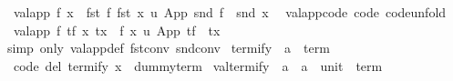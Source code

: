 \begin{isabellebody}
\ \ {\isachardoublequoteopen}valapp\ f\ x\ {\isacharequal}{\kern0pt}\ {\isacharparenleft}{\kern0pt}fst\ f\ {\isacharparenleft}{\kern0pt}fst\ x{\isacharparenright}{\kern0pt}{\isacharcomma}{\kern0pt}\ {\isasymlambda}u{\isachardot}{\kern0pt}\ App\ {\isacharparenleft}{\kern0pt}snd\ f\ {\isacharparenleft}{\kern0pt}{\isacharparenright}{\kern0pt}{\isacharparenright}{\kern0pt}\ {\isacharparenleft}{\kern0pt}snd\ x\ {\isacharparenleft}{\kern0pt}{\isacharparenright}{\kern0pt}{\isacharparenright}{\kern0pt}{\isacharparenright}{\kern0pt}{\isachardoublequoteclose}\isanewline
\isanewline
{}\isamarkupfalse%
\ valapp{\isacharunderscore}{\kern0pt}code\ {\isacharbrackleft}{\kern0pt}code{\isacharcomma}{\kern0pt}\ code{\isacharunderscore}{\kern0pt}unfold{\isacharbrackright}{\kern0pt}{\isacharcolon}{\kern0pt}\isanewline
\ \ {\isachardoublequoteopen}valapp\ {\isacharparenleft}{\kern0pt}f{\isacharcomma}{\kern0pt}\ tf{\isacharparenright}{\kern0pt}\ {\isacharparenleft}{\kern0pt}x{\isacharcomma}{\kern0pt}\ tx{\isacharparenright}{\kern0pt}\ {\isacharequal}{\kern0pt}\ {\isacharparenleft}{\kern0pt}f\ x{\isacharcomma}{\kern0pt}\ {\isasymlambda}u{\isachardot}{\kern0pt}\ App\ {\isacharparenleft}{\kern0pt}tf\ {\isacharparenleft}{\kern0pt}{\isacharparenright}{\kern0pt}{\isacharparenright}{\kern0pt}\ {\isacharparenleft}{\kern0pt}tx\ {\isacharparenleft}{\kern0pt}{\isacharparenright}{\kern0pt}{\isacharparenright}{\kern0pt}{\isacharparenright}{\kern0pt}{\isachardoublequoteclose}\isanewline
%
\isadelimproof
\ \ %
\endisadelimproof
%
\isatagproof
{}\isamarkupfalse%
\ {\isacharparenleft}{\kern0pt}simp\ only{\isacharcolon}{\kern0pt}\ valapp{\isacharunderscore}{\kern0pt}def\ fst{\isacharunderscore}{\kern0pt}conv\ snd{\isacharunderscore}{\kern0pt}conv{\isacharparenright}{\kern0pt}%
\endisatagproof
{\isafoldproof}%
%
\isadelimproof
%
\endisadelimproof
%
\isadelimdocument
%
\endisadelimdocument
%
\isatagdocument
%
\isamarkuptrue%
%
\endisatagdocument
{\isafolddocument}%
%
\isadelimdocument
%
\endisadelimdocument
{}\isamarkupfalse%
\ termify\ {\isacharcolon}{\kern0pt}{\isacharcolon}{\kern0pt}\ {\isachardoublequoteopen}{\isacharprime}{\kern0pt}a\ {\isasymRightarrow}\ term{\isachardoublequoteclose}\ \isanewline
\ \ {\isacharbrackleft}{\kern0pt}code\ del{\isacharbrackright}{\kern0pt}{\isacharcolon}{\kern0pt}\ {\isachardoublequoteopen}termify\ x\ {\isacharequal}{\kern0pt}\ dummy{\isacharunderscore}{\kern0pt}term{\isachardoublequoteclose}\isanewline
\isanewline
{}\isamarkupfalse%
\ valtermify\ {\isacharcolon}{\kern0pt}{\isacharcolon}{\kern0pt}\ {\isachardoublequoteopen}{\isacharprime}{\kern0pt}a\ {\isasymRightarrow}\ {\isacharprime}{\kern0pt}a\ {\isasymtimes}\ {\isacharparenleft}{\kern0pt}unit\ {\isasymRightarrow}\ term{\isacharparenright}{\kern0pt}{\isachardoublequoteclose}\ \isanewline

\end{isabellebody}
